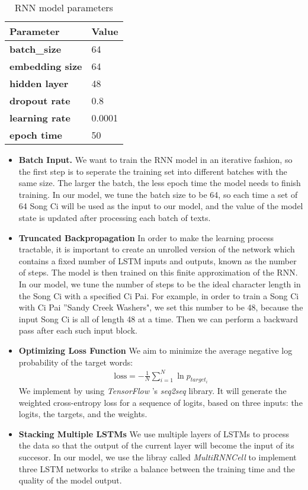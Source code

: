 \begin{table}[htpb]
\centering
\caption{RNN model parameters}
\label{table:rnn}
\begin{tabular}{|l|l|}
\hline
\textbf{Parameter}      & \textbf{Value} \\ \hline
\textbf{batch\_size}    & 64             \\ \hline
\textbf{embedding size} & 64             \\ \hline
\textbf{hidden layer}   & 48             \\ \hline
\textbf{dropout rate}   & 0.8            \\ \hline
\textbf{learning rate}  & 0.0001         \\ \hline
\textbf{epoch time}     & 50             \\ \hline
\end{tabular}
\end{table}

\begin{itemize}
\item \textbf{Batch Input.} We want to train the RNN model in an iterative fashion, so the first step is to seperate the training set into different batches with the same size. The larger the batch, the less epoch time the model needs to finish training. In our model, we tune the batch size to be 64, so each time a set of 64 Song Ci will be used as the input to our model, and the value of the model state is updated after processing each batch of texts.

\item \textbf{Truncated Backpropagation} In order to make the learning process tractable, it is important to create an unrolled version of the network which contains a fixed number of LSTM inputs and outputs, known as the number of steps. The model is then trained on this finite approximation of the RNN. 
%
In our model, we tune the number of steps to be the ideal character length in the Song Ci with a specified Ci Pai. For example, in order to train a Song Ci with Ci Pai ''Sandy Creek Washers", we set this number to be 48, because the input Song Ci is all of length 48 at a time.
%
Then we can perform a backward pass after each such input block.

\item \textbf{Optimizing Loss Function} We aim to minimize the average negative log probability of the target words: 
\begin{align*}
\text{loss} = -\frac{1}{N} \sum_{i=1}^{N} \ln p_{target_i}
\end{align*}
We implement by using \emph{TensorFlow} 's \emph{seq2seq} library. It will generate the weighted cross-entropy loss for a sequence of logits, based on three inputs: the logits, the targets, and the weights. 

 
\item \textbf{Stacking Multiple LSTMs} We  use multiple layers of LSTMs to process the data so that the output of the current layer will become the input of its succesor.
%
In our model,  we use the libray called \emph{MultiRNNCell} to implement three LSTM networks to strike a balance between the training time and the quality of the model output.
\end{itemize}

